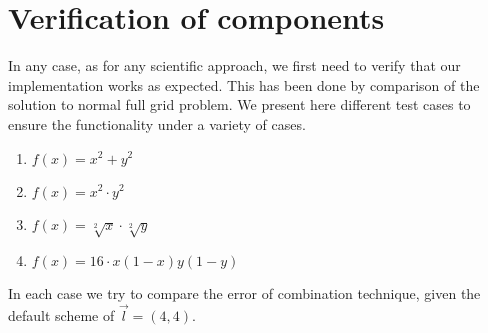 \section{Verification of components}
In any case, as for any scientific approach, we first need to verify that our implementation works as expected. This has been done by comparison of the solution to normal full grid problem. We present here different test cases to ensure the functionality under a variety of cases.
\begin{enumerate}
\item $f(x)=x^2+y^2$
\item $f(x)=x^2 \cdot y^2 $
\item $f(x)=\sqrt[2]{x} \cdot \sqrt[2]{y}$
\item $f(x)=16 \cdot x(1-x)y(1-y)$
\end{enumerate}
In each case we try to compare the error of combination technique, given the default scheme of $\overrightarrow{l}=(4,4)$.\\

